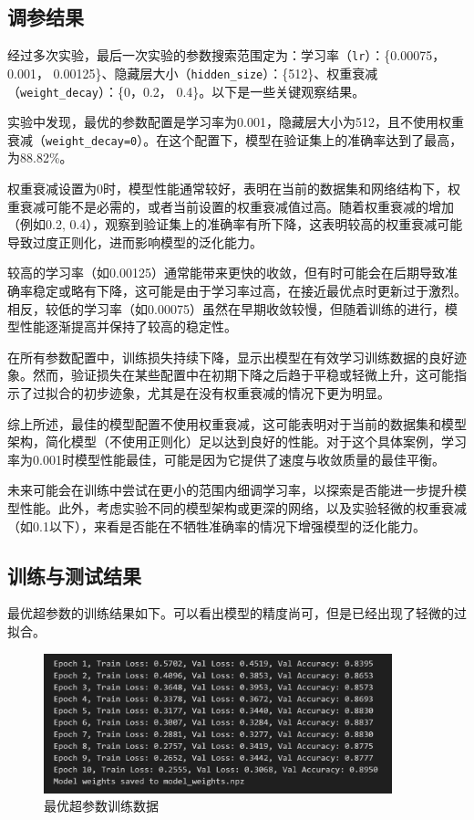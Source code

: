 \documentclass[a4paper,12pt]{article}
\begin{document}
\subsection{调参结果}

经过多次实验，最后一次实验的参数搜索范围定为：学习率（\texttt{lr}）：\{0.00075，0.001， 0.00125\}、隐藏层大小（\texttt{hidden\_size}）：\{512\}、权重衰减（\texttt{weight\_decay}）：\{0，0.2， 0.4\}。以下是一些关键观察结果。

实验中发现，最优的参数配置是学习率为0.001，隐藏层大小为512，且不使用权重衰减（\texttt{weight\_decay=0}）。在这个配置下，模型在验证集上的准确率达到了最高，为88.82\%。

权重衰减设置为0时，模型性能通常较好，表明在当前的数据集和网络结构下，权重衰减可能不是必需的，或者当前设置的权重衰减值过高。随着权重衰减的增加（例如0.2, 0.4），观察到验证集上的准确率有所下降，这表明较高的权重衰减可能导致过度正则化，进而影响模型的泛化能力。

较高的学习率（如0.00125）通常能带来更快的收敛，但有时可能会在后期导致准确率稳定或略有下降，这可能是由于学习率过高，在接近最优点时更新过于激烈。相反，较低的学习率（如0.00075）虽然在早期收敛较慢，但随着训练的进行，模型性能逐渐提高并保持了较高的稳定性。

在所有参数配置中，训练损失持续下降，显示出模型在有效学习训练数据的良好迹象。然而，验证损失在某些配置中在初期下降之后趋于平稳或轻微上升，这可能指示了过拟合的初步迹象，尤其是在没有权重衰减的情况下更为明显。

综上所述，最佳的模型配置不使用权重衰减，这可能表明对于当前的数据集和模型架构，简化模型（不使用正则化）足以达到良好的性能。对于这个具体案例，学习率为0.001时模型性能最佳，可能是因为它提供了速度与收敛质量的最佳平衡。

未来可能会在训练中尝试在更小的范围内细调学习率，以探索是否能进一步提升模型性能。此外，考虑实验不同的模型架构或更深的网络，以及实验轻微的权重衰减（如0.1以下），来看是否能在不牺牲准确率的情况下增强模型的泛化能力。


\subsection{训练与测试结果}
最优超参数的训练结果如下。可以看出模型的精度尚可，但是已经出现了轻微的过拟合。

\begin{figure}[H]
    \centering
    \includegraphics[width=0.9\textwidth]{train_stat.png}
    \caption{最优超参数训练数据}
    \label{fig:example}
\end{figure}
\end{document}
